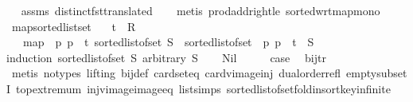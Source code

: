 \begin{isabellebody}
\isadelimproof
\ %
\endisadelimproof
%
\isatagproof
{}\isamarkupfalse%
\ assms\ distinct{\isacharunderscore}{\kern0pt}fst{\isacharunderscore}{\kern0pt}translated\isanewline
\ \ \isamarkupfalse%
\ {\isacharparenleft}{\kern0pt}metis\ prod{\isacharunderscore}{\kern0pt}addright{\isacharunderscore}{\kern0pt}le\ sorted{\isacharunderscore}{\kern0pt}wrt{\isacharunderscore}{\kern0pt}map{\isacharunderscore}{\kern0pt}mono{\isacharparenright}{\kern0pt}%
\endisatagproof
{\isafoldproof}%
%
\isadelimproof
%
\endisadelimproof
\ \isanewline
\isanewline
{}\isamarkupfalse%
\ map{\isacharunderscore}{\kern0pt}sorted{\isacharunderscore}{\kern0pt}list{\isacharunderscore}{\kern0pt}set{\isacharcolon}{\kern0pt}\isanewline
\ \ \ t\ {\isacharcolon}{\kern0pt}{\isacharcolon}{\kern0pt}\ R{}\isanewline
\ \ \ {\isachardoublequoteopen}map\ {\isacharparenleft}{\kern0pt}{\isasymlambda}\ p{\isachardot}{\kern0pt}\ p\ {\isacharplus}{\kern0pt}\ t{\isacharparenright}{\kern0pt}\ {\isacharparenleft}{\kern0pt}sorted{\isacharunderscore}{\kern0pt}list{\isacharunderscore}{\kern0pt}of{\isacharunderscore}{\kern0pt}set\ S{\isacharparenright}{\kern0pt}\ {\isacharequal}{\kern0pt}\ sorted{\isacharunderscore}{\kern0pt}list{\isacharunderscore}{\kern0pt}of{\isacharunderscore}{\kern0pt}set\ {\isacharparenleft}{\kern0pt}{\isacharparenleft}{\kern0pt}{\isasymlambda}\ p{\isachardot}{\kern0pt}\ p\ {\isacharplus}{\kern0pt}\ t{\isacharparenright}{\kern0pt}\ {\isacharbackquote}{\kern0pt}\ S{\isacharparenright}{\kern0pt}{\isachardoublequoteclose}\isanewline
%
\isadelimproof
%
\endisadelimproof
%
\isatagproof
{}\isamarkupfalse%
{\isacharparenleft}{\kern0pt}induction\ {\isachardoublequoteopen}sorted{\isacharunderscore}{\kern0pt}list{\isacharunderscore}{\kern0pt}of{\isacharunderscore}{\kern0pt}set\ S{\isachardoublequoteclose}\ arbitrary{\isacharcolon}{\kern0pt}\ S{\isacharparenright}{\kern0pt}\isanewline
\ \ \isamarkupfalse%
\ Nil\isanewline
\ \ \isamarkupfalse%
\ \isamarkupfalse%
\ {\isacharquery}{\kern0pt}case\ \isamarkupfalse%
\ bij{\isacharunderscore}{\kern0pt}tr\isanewline
\ \ \ \ \isamarkupfalse%
\ {\isacharparenleft}{\kern0pt}metis\ {\isacharparenleft}{\kern0pt}no{\isacharunderscore}{\kern0pt}types{\isacharcomma}{\kern0pt}\ lifting{\isacharparenright}{\kern0pt}\ bij{\isacharunderscore}{\kern0pt}def\ card{\isacharunderscore}{\kern0pt}seteq\ card{\isacharunderscore}{\kern0pt}vimage{\isacharunderscore}{\kern0pt}inj\ dual{\isacharunderscore}{\kern0pt}order{\isachardot}{\kern0pt}refl\ empty{\isacharunderscore}{\kern0pt}subsetI\ top{\isachardot}{\kern0pt}extremum\ inj{\isacharunderscore}{\kern0pt}vimage{\isacharunderscore}{\kern0pt}image{\isacharunderscore}{\kern0pt}eq\ list{\isachardot}{\kern0pt}simps{\isacharparenleft}{\kern0pt}{}{\isacharparenright}{\kern0pt}\ sorted{\isacharunderscore}{\kern0pt}list{\isacharunderscore}{\kern0pt}of{\isacharunderscore}{\kern0pt}set{\isachardot}{\kern0pt}fold{\isacharunderscore}{\kern0pt}insort{\isacharunderscore}{\kern0pt}key{\isachardot}{\kern0pt}infinite\isanewline

\end{isabellebody}
